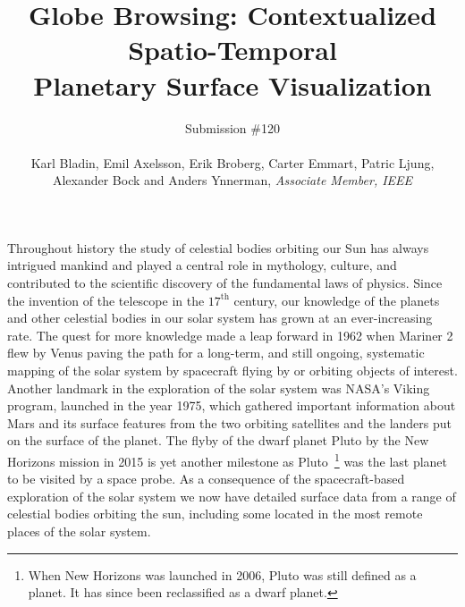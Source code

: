 \documentclass[journal]{vgtc}                %
\title{Globe Browsing: Contextualized Spatio-Temporal \\
Planetary Surface Visualization}
\author{Submission \#120 \\
\\
Karl Bladin, Emil Axelsson, Erik Broberg, Carter Emmart, Patric Ljung, \\ Alexander Bock and Anders Ynnerman, \textit{Associate Member, IEEE}}
\newcommand{\kallecomment}[1]{\textbf{[-Kalle-~}
    \textcolor{orange}{#1}
    \textbf{~]}}
\newcommand{\emilcomment}[1]{\textbf{[-Emil-~}
    \textcolor{red}{#1}
    \textbf{~]}}
\newcommand{\alexcomment}[1]{\textbf{[-Alex-~}
    \textcolor{magenta}{#1}
    \textbf{~]}}
\begin{document}

 \label{sec:introduction}
\maketitle


Throughout history the study of celestial bodies orbiting our Sun has always intrigued mankind and played a central role in mythology, culture, and contributed to the scientific discovery of the fundamental laws of physics.
Since the invention of the telescope in the $17^{\textrm{th}}$ century, our knowledge of the planets and other celestial bodies in our solar system has grown at an ever-increasing rate.
The quest for more knowledge made a leap forward in 1962 when Mariner 2 flew by Venus paving the path for a long-term, and still ongoing, systematic mapping of the solar system by spacecraft flying by or orbiting objects of interest.
Another landmark in the exploration of the solar system was NASA's Viking program, launched in the year 1975, which gathered important information about Mars and its surface features from the two orbiting satellites and the landers put on the surface of the planet.
The flyby of the dwarf planet Pluto by the New Horizons mission in 2015 is yet another milestone as Pluto~\footnote{When New Horizons was launched in 2006, Pluto was still defined as a planet. It has since been reclassified as a dwarf planet.} was the last planet to be visited by a space probe. As a consequence of the spacecraft-based exploration of the solar system we now have detailed surface data from a range of celestial bodies orbiting the sun, including some located in the most remote places of the solar system. 
\end{document}
